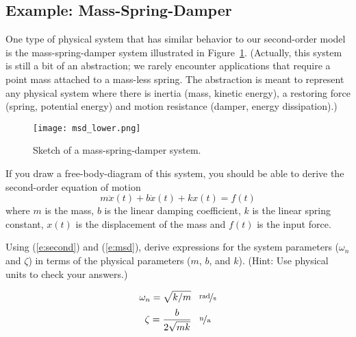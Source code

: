 \subsection{Example: Mass-Spring-Damper}
One type of physical system that has similar behavior to our second-order model is the mass-spring-damper system illustrated in Figure~\ref{f:msd2}.  (Actually, this system is still a bit of an abstraction; we rarely encounter applications that require a point mass attached to a mass-less spring.  The abstraction is meant to represent any physical system where there is inertia (mass, kinetic energy), a restoring force (spring, potential energy) and motion resistance (damper, energy dissipation).)
\begin{figure}[htb!]
\centerline{
{\texttt{[image: msd\_lower.png]}}}
\caption{Sketch of a mass-spring-damper system.}
\label{f:msd2}
\end{figure}

If you draw a free-body-diagram of this system, you should be able to derive the second-order equation of motion
\begin{equation}\label{e:msd}
m \ddot{x}(t) + b \dot{x}(t) + k x(t) = f(t)
\end{equation}
where $m$ is the mass, $b$ is the linear damping coefficient, $k$ is the linear spring constant, $x(t)$ is the displacement of the mass and $f(t)$ is the input force.

\begin{ex}
Using (\ref{e:second}) and (\ref{e:msd}), derive expressions for the system parameters ($\omega_n$ and $\zeta$) in terms of the physical parameters ($m$, $b$, and $k$).  (Hint: Use physical units to check your answers.)
\end{ex}

\ifsolutions
\begin{soln}
\[ \omega_n = \sqrt{k/m} \; \; \; \unitfrac[]{rad}{s}\]
\[ \zeta = \frac{b}{2 \sqrt{mk}} \; \; \; \unitfrac[]{n}{a} \]
\end{soln}
\fi


